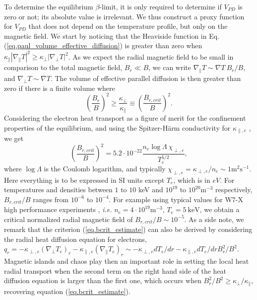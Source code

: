 \documentclass[my_thesis.tex]{subfiles}
\begin{document}
To determine the equilibrium $\beta$-limit, it is only required to determine if $V_{PD}$ is zero or not; its absolute value is irrelevant. We thus construct a proxy function for $V_{PD}$ that does not depend on the temperature profile, but only on the magnetic field. We start by noticing that the Heaviside function in Eq.(\ref{eq.paul_volume_effective_diffusion}) is greater than zero when $\kappa_\parallel|\nabla_\parallel T|^2\ge \kappa_\perp|\nabla_\perp T |^2$. As we expect the radial magnetic field to be small in comparison to the total magnetic field, $B_r\ll B$, we can write $\nabla_\parallel T\sim \nabla T\ B_r /B$, and $\nabla_\perp T\sim \nabla T$. The volume of effective parallel diffusion is then greater than zero if there is a finite volume where
\begin{equation}
	\left(\frac{B_r}{B}\right)^2  \ge  \frac{\kappa_\perp}{\kappa_\parallel} \equiv \left(\frac{B_{r,crit}}{B}\right)^2.\label{eq.bcrit_estimate}
\end{equation}
Considering the electron heat transport as a figure of merit for the confinement properties of the equilibrium, and using the Spitzer-H\"arm conductivity for $\kappa_{\parallel,e}$ \citep{s.i.braginskiiTransportProcessesPlasma1965}, we get
\begin{equation}
	\left(\frac{ B_{r,crit}}{B}\right)^2 =  5.2\cdot 10^{-22}\frac{n_e\log\Lambda \  \chi_{\perp,e}}{T_e^{5/2}},
\end{equation}
where $\log\Lambda$ is the Coulomb logarithm, and typically $\chi_{\perp,e}=\kappa_{\perp,e}/n_e\sim 1 \text{m}^2\text{s}^{-1}$. Here everything is to be expressed in SI units except $T_e$, which is in $eV$. For temperatures and densities between $1$ to $10$ keV and $10^{19}$ to $10^{20}\text{m}^{-3}$ respectively, $ B_{r,crit}/B$ ranges from $10^{-6}$ to $10^{-4}$. For example using typical values for W7-X high performance experiments \citep{klingerOverviewFirstWendelstein2019}, \textit{i.e.} $n_e=4\cdot10^{19}\text{m}^{-3}$, $T_e=5\ \text{keV}$, we obtain a critical normalized radial magnetic field of $ B_{r,crit}/B\sim 10^{-5}$. As a side note, we remark that the criterion (\ref{eq.bcrit_estimate}) can also be derived by considering the radial heat diffusion equation for electrons, $q_r = -\kappa_{\perp,e} (\nabla_\perp T_e)_r - \kappa_{\parallel,e} (\nabla_\parallel T_e)_r \sim -\kappa_{\perp,e} dT_e/dr -\kappa_{\parallel,e} dT_e/dr B_r^2/B^2$. Magnetic islands and chaos play then an important role in setting the local heat radial transport when the second term on the right hand side of the heat diffusion equation is larger than the first one, which occurs when $B_r^2/B^2\ge \kappa_\perp/\kappa_\parallel$, recovering equation (\ref{eq.bcrit_estimate}).
\end{document}
